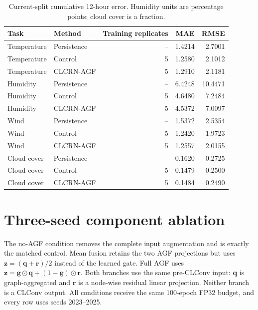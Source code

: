 \documentclass[10pt,a4paper]{article}
\begin{document}
\begin{table}[H]\centering\small\setlength{\tabcolsep}{5pt}\setlength{\parskip}{0pt}

\caption{Current-split cumulative 12-hour error. Humidity units are percentage points; cloud cover is a fraction.}\label{tab:context}

\begin{tabular}{llrrr}

\toprule
Task & Method & Training replicates & MAE & RMSE \\
\midrule

Temperature & Persistence & -- & 1.4214 & 2.7001 \\

Temperature & Control & 5 & 1.2580 & 2.1012 \\

Temperature & CLCRN-AGF & 5 & 1.2910 & 2.1181 \\

Humidity & Persistence & -- & 6.4248 & 10.4471 \\

Humidity & Control & 5 & 4.6480 & 7.2484 \\

Humidity & CLCRN-AGF & 5 & 4.5372 & 7.0097 \\

Wind & Persistence & -- & 1.5372 & 2.5354 \\

Wind & Control & 5 & 1.2420 & 1.9723 \\

Wind & CLCRN-AGF & 5 & 1.2557 & 2.0155 \\

Cloud cover & Persistence & -- & 0.1620 & 0.2725 \\

Cloud cover & Control & 5 & 0.1479 & 0.2500 \\

Cloud cover & CLCRN-AGF & 5 & 0.1484 & 0.2490 \\

\bottomrule\end{tabular}\end{table}

\section{Three-seed component ablation}
The no-AGF condition removes the complete input augmentation and is exactly the matched control. Mean fusion retains the two AGF projections but uses $\mathbf z=(\mathbf q+\mathbf r)/2$ instead of the learned gate. Full AGF uses $\mathbf z=\mathbf g\odot\mathbf q+(1-\mathbf g)\odot\mathbf r$. Both branches use the same pre-CLConv input: $\mathbf q$ is graph-aggregated and $\mathbf r$ is a node-wise residual linear projection. Neither branch is a CLConv output. All conditions receive the same 100-epoch FP32 budget, and every row uses seeds 2023--2025.
\end{document}
